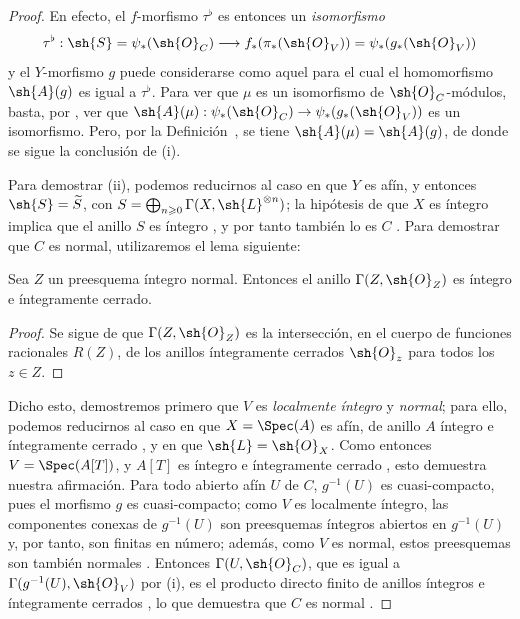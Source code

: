 \documentclass[oneside,10pt]{amsart}
\makeatletter
\renewcommand{\geq}{\geqslant}
\newcommand{\ega@arrow}[2]{\mathchoice{#1}{#2}{#2}{#2}}
\renewcommand{\to}{\ega@arrow{\longrightarrow}{\rightarrow}}
\newcommand{\oldpage}[2][]{\marginnote{\normalfont\footnotesize\textbf{#1}~|~#2}\ignorespaces}
\let\EGAOriginalLabel\label
\renewcommand{\label}[1]{\phantomsection\EGAOriginalLabel{#1}}
\makeatother
\begin{document}
\begin{proof}
En efecto, el $f$-morfismo $\tau^\flat$ es entonces un \emph{isomorfismo}
\[
  \tau^\flat:\sh{S}=\psi_*(\sh{O}_C)\to f_*(\pi_*(\sh{O}_V))=\psi_*(g_*(\sh{O}_V))
\]
y el $Y$-morfismo $g$ puede considerarse como aquel para el cual el homomorfismo $\sh{A}(g)$  es igual a $\tau^\flat$.
Para ver que $\mu$ es un isomorfismo de $\sh{O}_C$-módulos, basta, por , ver que $\sh{A}(\mu):\psi_*(\sh{O}_C)\to\psi_*(g_*(\sh{O}_V))$ es un isomorfismo.
Pero, por la Definición~, se tiene $\sh{A}(\mu)=\sh{A}(g)$, de donde se sigue la conclusión de (i).

Para demostrar (ii), podemos reducirnos al caso en que $Y$ es afín, y entonces $\sh{S}=\widetilde{S}$, con
\oldpage[II]{182}
$S=\bigoplus_{n\geq0}\Gamma(X,\sh{L}^{\otimes n})$;
la hipótesis de que $X$ es íntegro implica que el anillo $S$ es íntegro , y por tanto también lo es $C$ .
Para demostrar que $C$ es normal, utilizaremos el lema siguiente:

\begin{lemma}[8.8.6.1]
\label{II.8.8.6.1}
Sea $Z$ un preesquema íntegro normal.
Entonces el anillo $\Gamma(Z,\sh{O}_Z)$ es íntegro e íntegramente cerrado.
\end{lemma}

\begin{proof}
Se sigue de  que $\Gamma(Z,\sh{O}_Z)$ es la intersección, en el cuerpo de funciones racionales $R(Z)$, de los anillos íntegramente cerrados $\sh{O}_z$ para todos los $z\in Z$.
\end{proof}

Dicho esto, demostremos primero que $V$ es \emph{localmente íntegro} y \emph{normal};
para ello, podemos reducirnos al caso en que $X=\Spec(A)$ es afín, de anillo $A$ íntegro e íntegramente cerrado , y en que $\sh{L}=\sh{O}_X$.
Como entonces $V=\Spec(A[T])$, y $A[T]$ es íntegro e íntegramente cerrado \cite[p.~99]{II-24}, esto demuestra nuestra afirmación.
Para todo abierto afín $U$ de $C$, $g^{-1}(U)$ es cuasi-compacto, pues el morfismo $g$ es cuasi-compacto;
como $V$ es localmente íntegro, las componentes conexas de $g^{-1}(U)$ son preesquemas íntegros abiertos en $g^{-1}(U)$ y, por tanto, son finitas en número; además, como $V$ es normal, estos preesquemas son también normales .
Entonces $\Gamma(U,\sh{O}_C)$, que es igual a $\Gamma(g^{-1}(U),\sh{O}_V)$ por (i), es el producto directo finito de anillos íntegros e íntegramente cerrados , lo que demuestra que $C$ es normal .
\end{proof}
\end{document}
